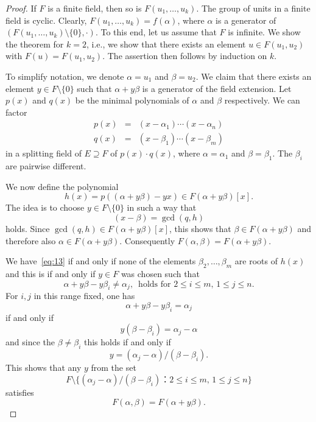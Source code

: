 \begin{proof}
  If $F$ is a finite field, then so is  $F(u_1,\dots,u_k)$. The group of units  in a finite field is cyclic. Clearly, $F(u_1,\dots,u_k) = f(α)$, where $α$ is a generator of $(F(u_1,\dots,u_k) \setminus \{0\}, ⋅)$. To this end, let us assume that $F$ is infinite. We show the theorem  for $k=2$, i.e., we show that there exists an element $u ∈ F(u_1,u_2)$ with $F(u) = F(u_1,u_2)$. The assertion  then  follows by induction on $k$.

 


To simplify notation, we denote  $α = u_1$ and $β = u_2$. We claim that there exists an element $y ∈F \setminus \{0\}$ such that $α + yβ$ is a generator of the field extension.  Let $p(x)$ and $q(x)$ be the minimal polynomials of $α$ and $β$ respectively. We can factor
  \begin{eqnarray*}
    p(x) & = &  (x- α_1) \cdots (x-α_n)  \\
    q(x) & = & (x- β_1) \cdots (x-β_m) 
  \end{eqnarray*}
  in a splitting field of $E ⊇ F$ of $p(x)⋅q(x)$, where $α=α_1$ and $β = β_1$. The $β_i$ are pairwise different.

  We now define the polynomial
  \begin{equation}
    \label{eq:12}
    h(x) = p( (α + y β) - y x) ∈ F(α + y β)[x]. 
  \end{equation}
  The idea is to choose $y ∈F \setminus \{0\}$ in such a way that
  \begin{equation}
    \label{eq:13}
    (x-β) =  \gcd(q,h) 
  \end{equation}
  holds.  Since $\gcd(q,h) ∈ F(α + y β)[x]$, this shows that
  $β ∈ F(α + y β)$ and therefore also $α ∈ F(α + y β)$. Consequently
  $F(α,β) = F(α + y β)$.

  We have~\eqref{eq:13} if and only if none of the elements $β_2,\dots,β_m$ are roots of $h(x)$ and this is if and only if $y ∈ F$ was chosen such that
  \begin{equation}
    \label{eq:14}
    α + y β - y β_i ≠ α_j, \, \text{ holds for } 2≤ i ≤ m, \, 1 ≤ j ≤ n.  
  \end{equation}
  For $i,j$ in this range fixed, one has
  \begin{displaymath}
     α + y β - y β_i = α_j 
   \end{displaymath}
   if and only if
   \begin{displaymath}
     y (β - β_i) = α_j - α 
   \end{displaymath}
   and since the $β≠ β_i$ this holds if and only if
   \begin{displaymath}
     y  = (α_j - α)  / (β - β_i). 
   \end{displaymath}
   This shows that any $y$ from the set
   \begin{displaymath}
     F \setminus \{ (α_j - α)  / (β - β_i) ：  2≤ i ≤ m, \, 1 ≤ j ≤ n\}
   \end{displaymath}
   satisfies
   \begin{displaymath}
     F(α,β) = F(α + y β). 
   \end{displaymath}  
\end{proof}



